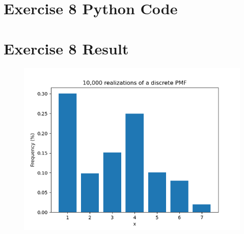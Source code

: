 \documentclass[11pt]{article}
\begin{document}
\section{Exercise 8 Python Code}


\pagebreak

\section{Exercise 8 Result}
\begin{figure}[h!]
\includegraphics[width=0.8\linewidth]{histogram.png}
\end{figure}
\end{document}
